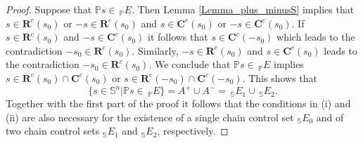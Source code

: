 \documentclass[preprint,12pt]{elsarticle}
\begin{document}
\begin{proof}
Suppose that $\mathbb{P}s\in\,_{\mathbb{P}}E$. Then Lemma
\ref{Lemma_plus_minusS} implies that $s\in\mathbf{R}^{c}(s_{0})$ or
$-s\in\mathbf{R}^{c}(s_{0})$ and $s\in\mathbf{C}^{c}(s_{0})$ or $-s\in
\mathbf{C}^{c}(s_{0})$. If $s\in\mathbf{R}^{c}(s_{0})$ and $-s\in
\mathbf{C}^{c}(s_{0})$ it follows that $s\in\mathbf{C}^{c}(-s_{0})$ which
leads to the contradiction $-s_{0}\in\mathbf{R}^{c}(s_{0})$. Similarly,
$-s\in\mathbf{R}^{c}(s_{0})$ and $s\in\mathbf{C}^{c}(s_{0})$ leads to the
contradiction $-s_{0}\in\mathbf{R}^{c}(s_{0})$. We conclude that
$\mathbb{P}s\in\,_{\mathbb{P}}E$ implies $s\in\mathbf{R}^{c}(s_{0}%
)\cap\mathbf{C}^{c}(s_{0})$ or $s\in\mathbf{R}^{c}(-s_{0})\cap\mathbf{C}%
^{c}(-s_{0})$. This shows that
\begin{equation}
\{s\in\mathbb{S}^{n}\left\vert \mathbb{P}s\in\,_{\mathbb{P}}E\right.
\}=A^{+}\cup A^{-}=\,_{\mathbb{S}}E_{1}\cup\,_{\mathbb{S}}E_{2}.
\label{contained1}%
\end{equation}
Together with the first part of the proof it follows that the conditions in
(i) and (ii) are also necessary for the existence of a single chain control
set $_{\mathbb{S}}E_{0}$ and of two chain control sets $_{\mathbb{S}}E_{1}$
and $_{\mathbb{S}}E_{2}$, respectively.


\end{proof}
\end{document}
